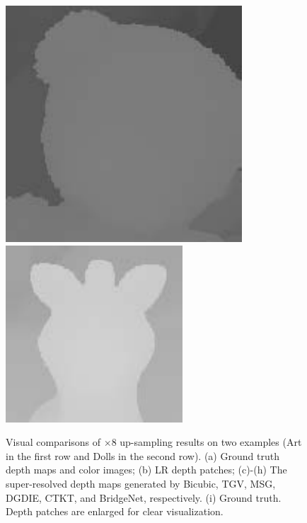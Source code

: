 \documentclass{bjtu-bachelor-thesis}
\begin{document}
\begin{figure}[!htbp]
\begin{minipage}[b]{\linewidth}
{\begin{minipage}[b]{0.085\linewidth}
      \includegraphics[width=\linewidth]{figures/doll/gt_0.pdf}\vspace{2pt}
      \includegraphics[width=\linewidth]{figures/doll/gt_1.pdf}
       \end{minipage}
  }
  \end{minipage}
  \vfill
  \caption{Visual comparisons of $\times 8$ up-sampling results on two examples (Art in the first row and Dolls in the second row). (a) Ground truth depth maps and color images; (b) LR depth patches; (c)-(h) The super-resolved depth maps generated by Bicubic, TGV, MSG, DGDIE, CTKT, and BridgeNet, respectively. (i) Ground truth. Depth patches are enlarged for clear visualization.}\label{fig:2}
\end{figure}
\end{document}

